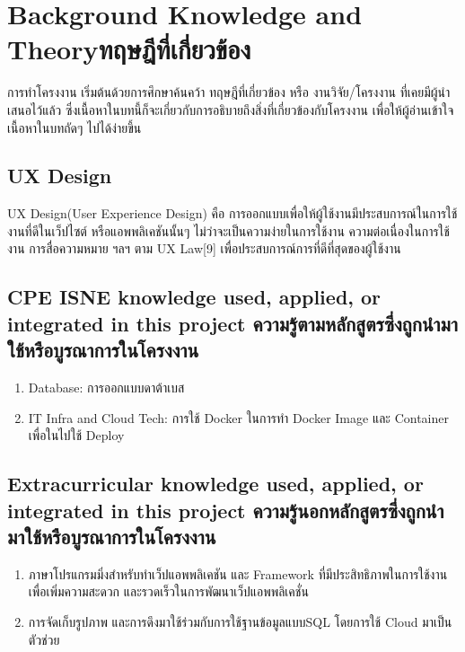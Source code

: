 \chapter{\ifenglish Background Knowledge and Theory\else ทฤษฎีที่เกี่ยวข้อง\fi}

การทำโครงงาน เริ่มต้นด้วยการศึกษาค้นคว้า ทฤษฎีที่เกี่ยวข้อง หรือ งานวิจัย/โครงงาน ที่เคยมีผู้นำเสนอไว้แล้ว ซึ่งเนื้อหาในบทนี้ก็จะเกี่ยวกับการอธิบายถึงสิ่งที่เกี่ยวข้องกับโครงงาน เพื่อให้ผู้อ่านเข้าใจเนื้อหาในบทถัดๆ ไปได้ง่ายขึ้น


\section{UX Design}
UX Design(User Experience Design) คือ การออกแบบเพื่อให้ผู้ใช้งานมีประสบการณ์ในการใช้งานที่ดีในเว็ปไซต์ หรือแอพพลิเคชันนั้นๆ
ไม่ว่าจะเป็นความง่ายในการใช้งาน ความต่อเนื่องในการใช้งาน การสื่อความหมาย ฯลฯ ตาม UX Law[9] เพื่อประสบการณ์การที่ดีที่สุดของผู้ใช้งาน


\section{\ifenglish%
\ifcpe CPE \else ISNE \fi knowledge used, applied, or integrated in this project
\else%
ความรู้ตามหลักสูตรซึ่งถูกนำมาใช้หรือบูรณาการในโครงงาน
\fi
}

\begin{enumerate}
    \item Database: การออกแบบดาต้าเบส
    \item IT Infra and Cloud Tech: การใช้ Docker ในการทำ Docker Image และ Container เพื่อในไปใช้ Deploy
\end{enumerate}

\section{\ifenglish%
Extracurricular knowledge used, applied, or integrated in this project
\else%
ความรู้นอกหลักสูตรซึ่งถูกนำมาใช้หรือบูรณาการในโครงงาน
\fi
}

\begin{enumerate}
    \item ภาษาโปรแกรมมิ่งสำหรับทำเว็ปแอพพลิเคชัน และ Framework ที่มีประสิทธิภาพในการใช้งานเพื่อเพิ่มความสะดวก และรวดเร็วในการพัฒนาเว็ปแอพพลิเคชั่น
    \item การจัดเก็บรูปภาพ และการดึงมาใช้ร่วมกับการใช้ฐานข้อมูลแบบSQL โดยการใช้ Cloud มาเป็นตัวช่วย
\end{enumerate}
